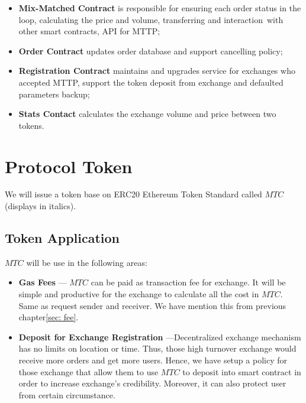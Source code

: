 \documentclass[UTF8,nofonts]{article}
\begin{document}
\begin{itemize}
 \item \textbf{Mix-Matched Contract} is responsible for ensuring each order status in the loop,  calculating the price and volume,  transferring and interaction with other smart contracts,  API for MTTP;
 \item  \textbf{Order Contract} updates order database and support cancelling policy;
 \item \textbf{Registration Contract} maintains and upgrades service for exchanges who accepted MTTP,  support the token deposit from exchange and defaulted parameters backup;
 \item \textbf{Stats Contact} calculates the exchange volume and price between two tokens.

\end{itemize}

\section{Protocol Token \label{sec: protocoltoken}}


We will issue a token base on ERC20 Ethereum Token Standard called $MTC$ (displays in italics).


\subsection{Token Application}

$MTC$ will be use in the following areas:

\begin{itemize}
 \item \textbf{Gas Fees} --- $MTC$ can be paid as transaction fee for exchange. It will be simple and productive for the exchange to calculate all the cost in $MTC$. Same as request sender and receiver. We have mention this from previous chapter\ref{sec: fee}.
 \item \textbf{Deposit for Exchange Registration} ---Decentralized exchange mechanism has no limits on location or time. Thus,  those high turnover exchange would receive more orders and get more users. Hence,  we have setup a policy for those exchange that allow them to use $MTC$ to deposit into smart contract in order to increase exchange's credibility. Moreover,  it can also protect user from certain circumstance.
\end{itemize}
\end{document}
